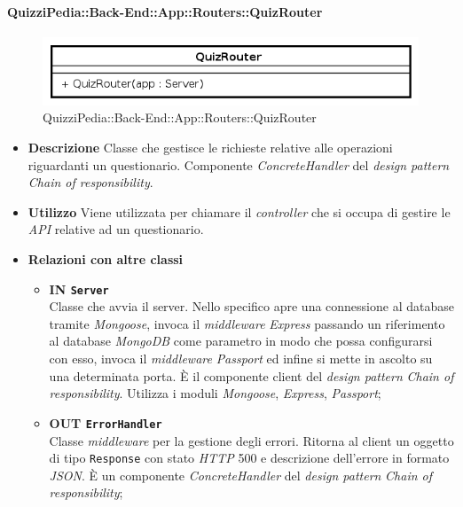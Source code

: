 \paragraph{QuizziPedia::Back-End::App::Routers::QuizRouter}
\label{QuizziPedia::Back-End::App::Routers::QuizRouter}
\begin{figure}[ht]
	\centering
	\includegraphics[scale=0.45]{UML/Classi/Back-End/QuizziPedia_Back-End_App_Routers_quizRouter.png}
	\caption{QuizziPedia::Back-End::App::Routers::QuizRouter}
\end{figure}
\FloatBarrier
	\begin{itemize}
		\item \textbf{Descrizione} 
		Classe che gestisce le richieste relative alle operazioni riguardanti un questionario. Componente \textit{ConcreteHandler} del \textit{design pattern} \textit{Chain of responsibility}.
		\item \textbf{Utilizzo} 
		Viene utilizzata per chiamare il \textit{controller} che si occupa di gestire le \textit{API} relative ad un questionario.
		\item \textbf{Relazioni con altre classi} 
		\begin{itemize}
		\item \textbf{IN \texttt{Server}} \\
			Classe che avvia il server. Nello specifico apre una connessione al database tramite \textit{Mongoose}, invoca il \textit{middleware} \textit{Express} passando un riferimento al database \textit{MongoDB} come parametro in modo che possa configurarsi con esso, invoca il \textit{middleware} \textit{Passport} ed infine si mette in ascolto su una determinata porta. È il componente client del \textit{design pattern} \textit{Chain of responsibility}. Utilizza i moduli \textit{Mongoose}, \textit{Express}, \textit{Passport};
		\item \textbf{OUT \texttt{ErrorHandler}} \\
			Classe \textit{middleware} per la gestione degli errori. Ritorna al client un oggetto di tipo \texttt{Response} con stato \textit{HTTP} 500 e descrizione dell'errore in formato \textit{JSON}. È un componente \textit{ConcreteHandler} del \textit{design pattern} \textit{Chain of responsibility};

\end{itemize}
\end{itemize}
